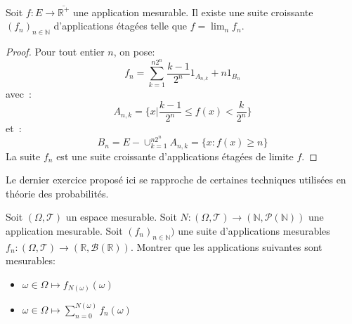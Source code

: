 \begin{mandatory}
\begin{prop}\label{ch2:1}
Soit $f : E \to \overline{\mathbb{R}^+}$ une application mesurable. Il
existe une suite croissante $(f_n)_{n \in \mathbb{N}}$ d'applications
étagées telle que $f = \lim_n f_n$.
\end{prop}
\end{mandatory}
\begin{proof}
Pour tout entier $n$, on pose:
\[
f_n = \sum_{k=1}^{n2^n} \frac{k-1}{2^n} 1_{A_{n,k}} + n 1_{B_n}
\]
avec~:
\[
A_{n,k} = \{x | \frac{k-1}{2^n} \leq f(x) < \frac{k}{2^n} \}
\]
et~:
\[
B_n = E - \cup_{k=1}^{n2^n} A_{n,k} = \{x: f(x) \geq n \}
\]
La suite $f_n$ est une suite croissante d'applications étagées de
limite $f$.
\end{proof}
Le dernier exercice proposé ici se rapproche de certaines techniques utilisées
en théorie des probabilités.
\begin{exercice}
Soit $\left(\Omega, \mathcal{T}\right)$ un espace mesurable. Soit $N \colon
\left(\Omega, \mathcal{T}\right) \to \left( \mathbb{N},
\mathcal{P}(\mathbb{N})\right)$ une application mesurable. Soit $(f_n)_{n \in
\mathbb{N}})$ une suite d'applications mesurables $f_n \colon \left(\Omega,
\mathcal{T}\right) \to \left( \mathbb{R}, \mathcal{B}(\mathbb{R})\right)$.
Montrer que les applications suivantes sont mesurables:
\begin{itemize}
  \item $\omega \in \Omega \mapsto f_{N(\omega)}(\omega)$
  \item  $\omega \in \Omega \mapsto \sum_{n=0}^{N(\omega)}f_n(\omega)$
\end{itemize}
\end{exercice}
